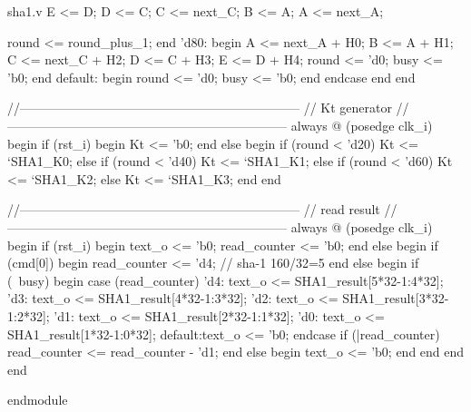 \begin{chunk}{sha1.v}
          E <= D;
          D <= C;
          C <= next_C;
          B <= A;
          A <= next_A;
            
          round <= round_plus_1;
        end
      'd80:
        begin
          A <= next_A + H0;
          B <= A + H1;
          C <= next_C + H2;
          D <= C + H3;
          E <= D + H4;
          round <= 'd0;
          busy <= 'b0;
        end
      default:
        begin
          round <= 'd0;
          busy <= 'b0;
        end
      endcase
    end  
  end 
  
  
  //------------------------------------------------------------------  
  // Kt generator
  //------------------------------------------------------------------  
  always @ (posedge clk_i)
  begin
    if (rst_i)
    begin
      Kt <= 'b0;
    end
    else
    begin
      if (round < 'd20)
        Kt <= `SHA1_K0;
      else
      if (round < 'd40)
        Kt <= `SHA1_K1;
      else
      if (round < 'd60)
        Kt <= `SHA1_K2;
      else
        Kt <= `SHA1_K3;
    end
  end

  //------------------------------------------------------------------  
  // read result 
  //------------------------------------------------------------------  
  always @ (posedge clk_i)
  begin
    if (rst_i)
    begin
      text_o <= 'b0;
      read_counter <= 'b0;
    end
    else
    begin
      if (cmd[0])
      begin
        read_counter <= 'd4;  // sha-1   160/32=5
      end
      else
      begin
      if (~busy)
      begin
        case (read_counter)
          'd4:  text_o <= SHA1_result[5*32-1:4*32];
          'd3:  text_o <= SHA1_result[4*32-1:3*32];
          'd2:  text_o <= SHA1_result[3*32-1:2*32];
          'd1:  text_o <= SHA1_result[2*32-1:1*32];
          'd0:  text_o <= SHA1_result[1*32-1:0*32];
          default:text_o <= 'b0;
        endcase
        if (|read_counter)
          read_counter <= read_counter - 'd1;
      end
      else
      begin
        text_o <= 'b0;
      end
      end
    end
  end
  
endmodule
 
\end{chunk}
